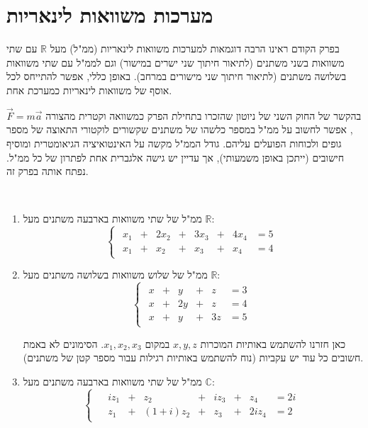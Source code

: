 \documentclass[
  hebrew,
  12pt,
  a4paper,
  oneside]{book}
\theoremstyle{definition}
\theoremstyle{remark}
\theoremstyle{plain}
\theoremstyle{remark}
\begin{document}
\section{מערכות משוואות
לינאריות}\label{ux5deux5e2ux5e8ux5dbux5d5ux5ea-ux5deux5e9ux5d5ux5d5ux5d0ux5d5ux5ea-ux5dcux5d9ux5e0ux5d0ux5e8ux5d9ux5d5ux5ea-1}

בפרק הקודם ראינו הרבה דוגמאות למערכות משוואות לינאריות (ממ"ל) מעל
\(\mathbb R\) עם שתי משוואות בשני משתנים (לתיאור חיתוך שני ישרים במישור)
וגם לממ"ל עם שתי משוואות בשלושה משתנים (לתיאור חיתוך שני מישורים במרחב).
באופן כללי, אפשר להתייחס לכל אוסף של משוואות לינאריות כמערכת אחת.

בהקשר של החוק השני של ניוטון שהזכרו בתחילת הפרק כמשוואה וקטרית מהצורה
\(\vec{F}=m\vec{a}\), אפשר לחשוב על ממ"ל במספר כלשהו של משתנים שקשורים
לוקטורי התאוצה של מספר גופים ולכוחות הפועלים עליהם. גודל הממ"ל מקשה על
האינטואיציה הגיאומטרית ומוסיף חישובים (ייתכן באופן משמעותי), אך עדיין יש
גישה אלגברית אחת לפתרון של כל ממ"ל. נפתח אותה בפרק זה.

\begin{example}

~

\begin{enumerate}
\def\labelenumi{\arabic{enumi}.}
\item
  ממ"ל של שתי משוואות בארבעה משתנים מעל \(\mathbb R\): \[\begin{cases}
  \begin{alignedat}{7}
  x_1 &{}+{}& 2x_2 &{}+{}& 3x_3 &{}+{}& 4x_4 &= 5 \\[4pt]
  x_1 &{}+{}&  x_2 &{}+{}&  x_3 &{}+{}&  x_4 &= 4
  \end{alignedat}
  \end{cases}\]
\item
  ממ"ל של שלוש משוואות בשלושה משתנים מעל \(\mathbb R\): \[\begin{cases}
  \begin{alignedat}{7}
  x &{}+{}&  y &{}+{}&  z &= 3 \\[4pt]
  x &{}+{}& 2y &{}+{}&  z &= 4 \\[4pt]
  x &{}+{}&  y &{}+{}& 3z &= 5
  \end{alignedat}
  \end{cases}\]

  כאן חזרנו להשתמש באותיות המוכרות \(x,y,z\) במקום \(x_1,x_2,x_3\).
  הסימונים לא באמת חשובים כל עוד יש עקביות (נוח להשתמש באותיות רגילות
  עבור מספר קטן של משתנים).
\item
  ממ"ל של שתי משוואות בארבעה משתנים מעל \(\mathbb C\): \[\begin{cases}
  \begin{alignedat}{8}
   & i z_1  &{}+{}&      z_2 &{}+{}&  i z_3 &{}+{}&     z_4 &= 2i \\[4pt]
   &   z_1  &{}+{}& (1+i)z_2 &{}+{}&      z_3 &{}+{}& 2i z_4 &= 2
  \end{alignedat}
  \end{cases}\]
\end{enumerate}

\end{example}
\end{document}
